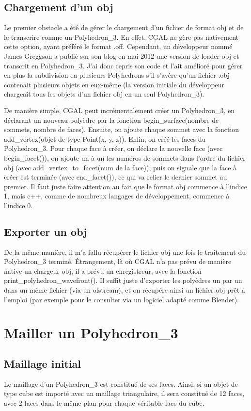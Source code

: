 \documentclass[a4paper,french]{report}
\begin{document}
			\subsection{Chargement d'un obj}
				Le premier obstacle a été de gérer le chargement d'un fichier de format obj et de le transcrire comme un Polyhedron\_3. En effet, CGAL ne gère pas nativement cette option, ayant préféré le format .off. Cependant, un développeur nommé James Greggson a publié sur son blog \cite{JGREG} en mai 2012 une version de loader obj et transcrit en Polyhedron\_3. J'ai donc repris son code et l'ait amélioré pour gérer en plus la subdivision en plusieurs Polyhedrons s'il s'avère qu'un fichier .obj contenait plusieurs objets en eux-même (la version initiale du développeur chargeait tous les objets d'un fichier obj en un seul Polyhedron\_3). \par 
				De manière simple, CGAL peut incrémentalement créer un Polyhedron\_3, en déclarant un nouveau polyèdre par la fonction begin\_surface(nombre de sommets, nombre de faces). Ensuite, on ajoute chaque sommet avec la fonction add\_vertex(objet de type Point(x, y, z)). Enfin, on créé les faces du Polyhedron\_3. Pour chaque face à créer, on déclare la nouvelle face (avec begin\_facet()), on ajoute un à un les numéros de sommets dans l'ordre du fichier obj (avec add\_vertex\_to\_facet(num de la face)), puis on signale que la face à créer est terminée (avec end\_facet()), ce qui va relier le dernier sommet au premier. Il faut juste faire attention au fait que le format obj commence à l'indice 1, mais c++, comme de nombreux langages de développement, commence à l'indice 0.
			
			\subsection{Exporter un obj}
				De la même manière, il m'a fallu récupérer le fichier obj une fois le traitement du Polyhedron\_3 terminé. Étrangement, là où CGAL n'a pas prévu de manière native un chargeur obj, il a prévu un enregistreur, avec la fonction print\_polyhedron\_wavefront(). Il suffit juste d'exporter les polyèdres un par un dans un même fichier (via un ofstream), et on récupère ainsi un fichier obj prêt à l'emploi (par exemple pour le consulter via un logiciel adapté comme Blender).
		\section{Mailler un Polyhedron\_3}
			\subsection{Maillage initial}
				Le maillage d'un Polyhedron\_3 est constitué de ses faces. Ainsi, si un objet de type cube est importé avec un maillage triangulaire, il sera constitué de 12 faces, avec 2 faces dans le même plan pour chaque véritable face du cube.
\end{document}
